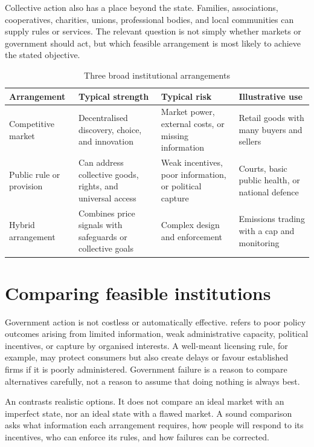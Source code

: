 Collective action also has a place beyond the state. Families, associations,
cooperatives, charities, unions, professional bodies, and local communities
can supply rules or services. The relevant question is not simply whether
markets or government should act, but which feasible arrangement is most likely
to achieve the stated objective.

\begin{table}[htbp]
  \centering
  \caption{Three broad institutional arrangements}
  \label{tab:institutional-arrangements}
  \begingroup
  \small
  \renewcommand{\arraystretch}{1.16}
  \begin{tabular}{@{}p{2.2cm}p{3.0cm}p{3.3cm}p{3.1cm}@{}}
    \toprule
    Arrangement & Typical strength & Typical risk & Illustrative use \\
    \midrule
    Competitive market &
    Decentralised discovery, choice, and innovation &
    Market power, external costs, or missing information &
    Retail goods with many buyers and sellers \\
    Public rule or provision &
    Can address collective goods, rights, and universal access &
    Weak incentives, poor information, or political capture &
    Courts, basic public health, or national defence \\
    Hybrid arrangement &
    Combines price signals with safeguards or collective goals &
    Complex design and enforcement &
    Emissions trading with a cap and monitoring \\
    \bottomrule
  \end{tabular}
  \endgroup
\end{table}
\FloatBarrier

\section{Comparing feasible institutions}

Government action is not costless or automatically effective.
 refers to poor policy outcomes arising from
limited information, weak administrative capacity, political incentives, or
capture by organised interests. A well-meant licensing rule, for example, may
protect consumers but also create delays or favour established firms if it is
poorly administered. Government failure is a reason to compare alternatives
carefully, not a reason to assume that doing nothing is always best.

An  contrasts realistic options. It does not
compare an ideal market with an imperfect state, nor an ideal state with a
flawed market. A sound comparison asks what information each arrangement
requires, how people will respond to its incentives, who can enforce its rules,
and how failures can be corrected.

